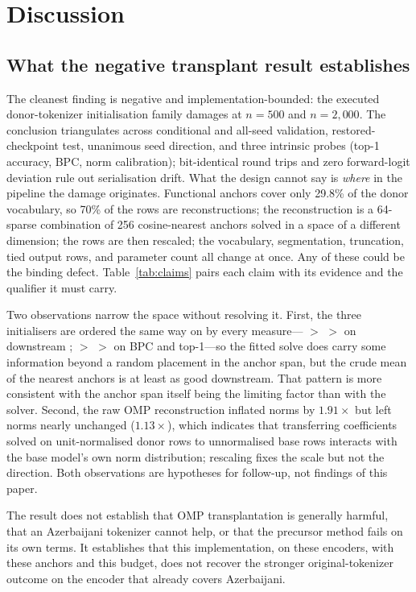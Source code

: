 \section{Discussion}
\label{sec:discussion}

\subsection{What the negative transplant result establishes}
The cleanest finding is negative and implementation-bounded: the executed donor-tokenizer initialisation family damages \xlmr{} at $n=500$ and $n=2{,}000$. The conclusion triangulates across conditional and all-seed validation, restored-checkpoint test, unanimous seed direction, and three intrinsic probes (top-1 accuracy, BPC, norm calibration); bit-identical round trips and zero forward-logit deviation rule out serialisation drift. What the design cannot say is \emph{where} in the pipeline the damage originates. Functional anchors cover only 29.8\% of the donor vocabulary, so 70\% of the rows are reconstructions; the reconstruction is a 64-sparse combination of 256 cosine-nearest anchors solved in a space of a different dimension; the rows are then rescaled; the vocabulary, segmentation, truncation, tied output rows, and parameter count all change at once. Any of these could be the binding defect. Table~\ref{tab:claims} pairs each claim with its evidence and the qualifier it must carry.

Two observations narrow the space without resolving it. First, the three initialisers are ordered the same way on \xlmr{} by every measure---\Mean{} $>$ \OMP{} $>$ \Random{} on downstream \Fone; \OMP{} $>$ \Mean{} $>$ \Random{} on BPC and top-1---so the fitted solve does carry some information beyond a random placement in the anchor span, but the crude mean of the nearest anchors is at least as good downstream. That pattern is more consistent with the anchor span itself being the limiting factor than with the solver. Second, the raw OMP reconstruction inflated \xlmr{} norms by $1.91\times$ but left \xlmxv{} norms nearly unchanged ($1.13\times$), which indicates that transferring coefficients solved on unit-normalised donor rows to unnormalised base rows interacts with the base model's own norm distribution; rescaling fixes the scale but not the direction. Both observations are hypotheses for follow-up, not findings of this paper.

The result does not establish that OMP transplantation is generally harmful, that an Azerbaijani tokenizer cannot help, or that the precursor method fails on its own terms. It establishes that this implementation, on these encoders, with these anchors and this budget, does not recover the stronger original-tokenizer outcome on the encoder that already covers Azerbaijani.

